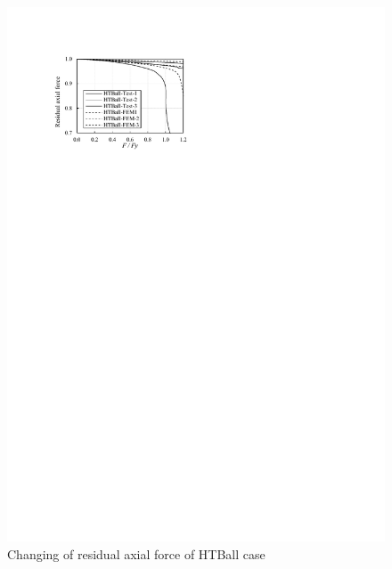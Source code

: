 \begin{figure}
    \centering
    \begin{minipage}[t]{0.48\textwidth}
    \includegraphics[width=\linewidth]{imgs/ch4/figA6.pdf}
    \caption{Changing of residual axial force of HTBall case}
    \label{ch4figA6}
    \end{minipage}
    \begin{minipage}[t]{0.48\textwidth}
    \centering

\end{minipage}
\end{figure}

